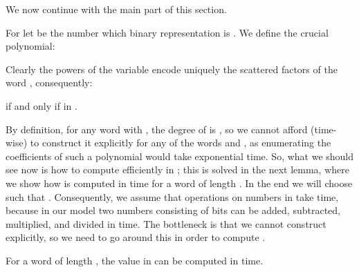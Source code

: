 \documentclass[runningheads]{llncs}
\begin{document}
We now continue with the main part of this section.

For  let  be the number which binary representation is . We define the crucial polynomial:

\begin{example}

\end{example}
Clearly the powers of the variable  encode uniquely the scattered factors of the word , consequently:
\begin{observation}
 if and only if  in .
\end{observation}

By definition, for any word  with , the degree of  is , so we cannot afford (time-wise) to construct it explicitly for any of the words  and , as enumerating the coefficients of such a polynomial would take exponential time. So, what we should see now is how to compute efficiently  in ; this is solved in the next lemma, where we show how  is computed in time  for a word  of length .
In the end we will choose  such that . Consequently, we assume that
operations on numbers in  take  time, because in our model two numbers consisting of
 bits can be added, subtracted, multiplied, and divided in  time.
The bottleneck is that we cannot construct  explicitly, so we need to go around this in order to compute .
\begin{lemma}
For a word  of length , the value  in  can be computed in  time.
\end{lemma}
\end{document}
